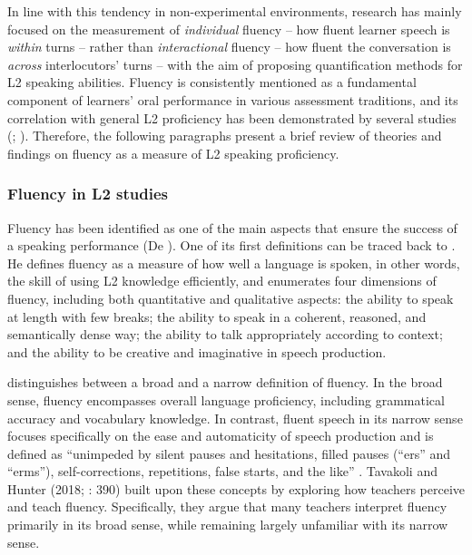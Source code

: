 In line with this tendency in non-experimental environments, research has mainly focused on the measurement of \textit{individual} fluency – how fluent learner speech is \textit{within} turns – rather than \textit{interactional} fluency – how fluent the conversation is \textit{across} interlocutors’ turns – \citep{Peltonen2017} with the aim of proposing quantification methods for L2 speaking abilities. Fluency is consistently mentioned as a fundamental component of learners’ oral performance in various assessment traditions, and its correlation with general L2 proficiency has been demonstrated by several studies (\citealt{DeJongEtAl2015,DeJongEtAl2013}; \citealt{SegalowitzFreed2004}). Therefore, the following paragraphs present a brief review of theories and findings on fluency as a measure of L2 speaking proficiency.

\subsubsection{  Fluency in L2 studies}
\hypertarget{Toc191305926}{}
Fluency has been identified as one of the main aspects that ensure the success of a speaking performance (De \citealt{Jong2016}). One of its first definitions can be traced back to \citet{Fillmore1979}. He defines fluency as a measure of how well a language is spoken, in other words, the skill of using L2 knowledge efficiently, and enumerates four dimensions of fluency, including both quantitative and qualitative aspects: the ability to speak at length with few breaks; the ability to speak in a coherent, reasoned, and semantically dense way; the ability to talk appropriately according to context; and the ability to be creative and imaginative in speech production.

\citet{Lennon1990} distinguishes between a broad and a narrow definition of fluency. In the broad sense, fluency encompasses overall language proficiency, including grammatical accuracy and vocabulary knowledge. In contrast, fluent speech in its narrow sense focuses specifically on the ease and automaticity of speech production and is defined as “unimpeded by silent pauses and hesitations, filled pauses (“ers” and “erms”), self-corrections, repetitions, false starts, and the like” . Tavakoli and Hunter (2018; \citealt{Lennon1990}: 390) built upon these concepts by exploring how teachers perceive and teach fluency. Specifically, they argue that many teachers interpret fluency primarily in its broad sense, while remaining largely unfamiliar with its narrow sense.

